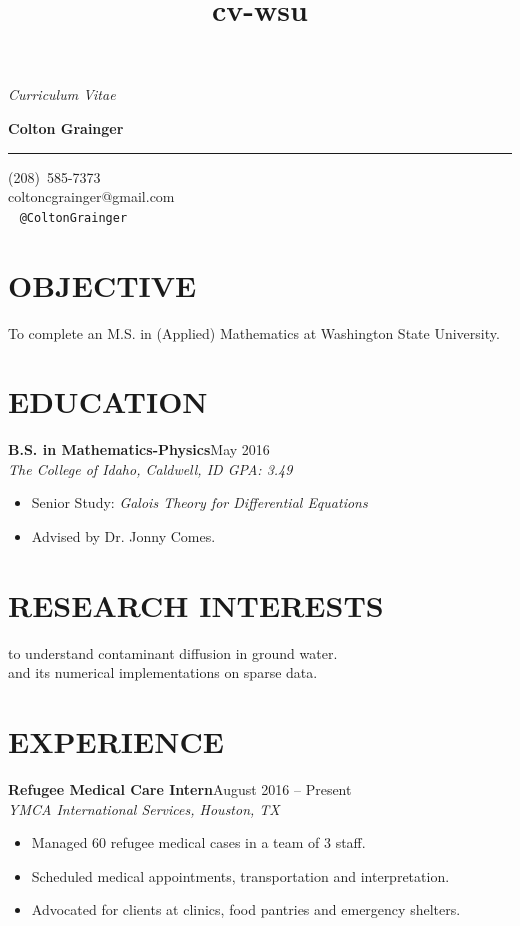 \documentclass[margin]{res}
\title{cv-wsu}
\newcommand\textbox[1]{\parbox{.333\textwidth}{#1} }
\newcommand\job[3]{\textbf{#1}\hfill {#2}\\ \emph{#3} }
\newcommand\degree[3]{\textbf{#1}\hfill {#2}\\ \emph{#3} }
\newenvironment{details}{\begin{itemize}[itemsep=0.6pt,topsep=2.2pt] }{\end{itemize} }
\begin{document}
 

\noindent\textbox{{\it Curriculum Vitae }\hfill } \textbox{\hfill{\large\bf Colton Grainger}\hfill }

\vspace{-20pt}
\rule{\textwidth}{1pt}

\vspace{-20pt}
\begin{flushright} 
(208)~585-7373\\ coltoncgrainger@gmail.com\\ \faTwitter\ \faGithub\hspace{1ex} {\tt @ColtonGrainger} 
\end{flushright}
\vspace{-24pt}

\begin{resume}

\section{OBJECTIVE}
To complete an M.S. in (Applied) Mathematics at Washington State University.

\section{EDUCATION}
\degree{B.S. in Mathematics-Physics}{May 2016}{The College of Idaho, Caldwell, ID \hfill {\rm GPA: 3.49}}
    \begin{details}
   		\item Senior Study: \emph{Galois Theory for Differential Equations}
        \item Advised by Dr. Jonny Comes.
    \end{details}

\section{RESEARCH INTERESTS}
 to understand contaminant diffusion in ground water.\\
 and its numerical implementations on sparse data.

\section{EXPERIENCE}
\job{Refugee Medical Care Intern}{August 2016 -- Present}{YMCA International Services, Houston, TX}
    \begin{details}
	  	\item Managed 60 refugee medical cases in a team of 3 staff.
        \item Scheduled medical appointments, transportation and interpretation.
        \item Advocated for clients at clinics, food pantries and emergency shelters. 
	\end{details}
     

\end{resume}
\end{document}

